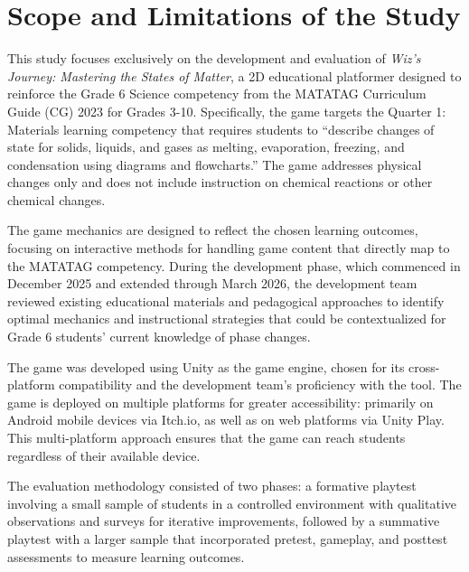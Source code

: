\section{Scope and Limitations of the Study}

This study focuses exclusively on the development and evaluation of \textit{Wiz's Journey: Mastering the States of Matter}, a 2D educational platformer designed to reinforce the Grade 6 Science competency from the MATATAG Curriculum Guide (CG) 2023 for Grades 3-10. Specifically, the game targets the Quarter 1: Materials learning competency that requires students to ``describe changes of state for solids, liquids, and gases as melting, evaporation, freezing, and condensation using diagrams and flowcharts.'' The game addresses physical changes only and does not include instruction on chemical reactions or other chemical changes.

The game mechanics are designed to reflect the chosen learning outcomes, focusing on interactive methods for handling game content that directly map to the MATATAG competency. During the development phase, which commenced in December 2025 and extended through March 2026, the development team reviewed existing educational materials and pedagogical approaches to identify optimal mechanics and instructional strategies that could be contextualized for Grade 6 students' current knowledge of phase changes.

The game was developed using Unity as the game engine, chosen for its cross-platform compatibility and the development team's proficiency with the tool. The game is deployed on multiple platforms for greater accessibility: primarily on Android mobile devices via Itch.io, as well as on web platforms via Unity Play. This multi-platform approach ensures that the game can reach students regardless of their available device.

The evaluation methodology consisted of two phases: a formative playtest involving a small sample of students in a controlled environment with qualitative observations and surveys for iterative improvements, followed by a summative playtest with a larger sample that incorporated pretest, gameplay, and posttest assessments to measure learning outcomes.

